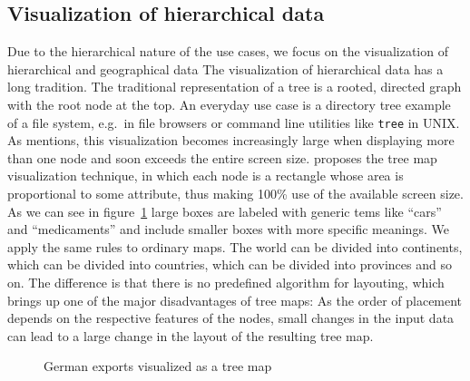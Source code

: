 \documentclass{article}
\begin{document}
\subsection{Visualization of hierarchical data}
Due to the hierarchical nature of the use cases, we focus on the visualization of hierarchical and geographical data
The visualization of hierarchical data has a long tradition.
The traditional representation of a tree is a rooted, directed graph with the root node at the top.
An everyday use case is a directory tree example of a file system, e.g.\ in file browsers or command line utilities like \texttt{tree} in UNIX\@.
As \textcite{Shneiderman1992} mentions, this visualization becomes increasingly large when displaying more than one node and soon exceeds the entire screen size.
\textcite{Johnson1991} proposes the tree map visualization technique, in which each node is a rectangle whose area is proportional to some attribute, thus making 100\% use of the available screen size.
As we can see in figure~\ref{fig:research:treemap} large boxes are labeled with generic tems like ``cars'' and ``medicaments'' and include smaller boxes with more specific meanings.
We apply the same rules to ordinary maps.
The world can be divided into continents, which can be divided into countries, which can be divided into provinces and so on.
The difference is that there is no predefined algorithm for layouting, which brings up one of the major disadvantages of tree maps:
As the order of placement depends on the respective features of the nodes, small changes in the input data can lead to a large change in the layout of the resulting tree map.

\begin{figure}[h]
  \centering
   \caption{German exports visualized as a tree map}
  \label{fig:research:treemap}
\end{figure}
\end{document}
